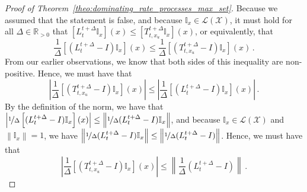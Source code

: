 \documentclass[10pt,a4paper]{paper}
\theoremstyle{definition}
\newcommand{\reals}{\mathbb{R}}
\newcommand{\realspos}{\reals_{>0}}
\newcommand{\states}{\mathcal{X}}
\newcommand{\gambles}{\mathcal{L}}
\newcommand{\gamblesX}{\gambles(\states)}
\newcommand{\ind}[1]{\mathbb{I}_{#1}}
\newcommand{\norm}[1]{\left\lVert #1 \right\rVert}
\newcommand{\abs}[1]{\left\vert #1 \right\vert}
\begin{document}
\begin{proof}[Proof of Theorem~\ref{theo:dominating_rate_processes_max_set}]
Because we assumed that the statement is false, and because $\ind{x}\in\gamblesX$, it must hold for all $\Delta\in\realspos$ that $\left[L_{t}^{t+\Delta}\ind{x}\right](x)\leq\left[T_{t,x_u}^{t+\Delta}\ind{x}\right](x)$, or equivalently, that
\begin{equation*}
\frac{1}{\Delta}\left[(L_{t}^{t+\Delta} - I)\ind{x}\right](x) \leq \frac{1}{\Delta}\left[(T_{t,x_u}^{t+\Delta} - I)\ind{x}\right](x)\,.
\end{equation*}
From our earlier observations, we know that both sides of this inequality are non-positive. Hence, we must have that
\begin{equation*}
\abs{\frac{1}{\Delta}\left[(T_{t,x_u}^{t+\Delta} - I)\ind{x}\right](x)} \leq \abs{\frac{1}{\Delta}\left[(L_{t}^{t+\Delta} - I)\ind{x}\right](x)}\,.
\end{equation*}
By the definition of the norm, we have that $\abs{\nicefrac{1}{\Delta}\left[(L_{t}^{t+\Delta} - I)\ind{x}\right](x)}\leq\norm{\nicefrac{1}{\Delta}(L_{t}^{t+\Delta} - I)\ind{x}}$, and because $\ind{x}\in\gamblesX$ and $\norm{\ind{x}}=1$, we have $\norm{\nicefrac{1}{\Delta}(L_{t}^{t+\Delta} - I)\ind{x}}\leq \norm{\nicefrac{1}{\Delta}(L_{t}^{t+\Delta} - I)}$. Hence, we must have that
\begin{equation*}
\abs{\frac{1}{\Delta}\left[(T_{t,x_u}^{t+\Delta} - I)\ind{x}\right](x)} \leq \norm{\frac{1}{\Delta}(L_{t}^{t+\Delta} - I)}\,.
\end{equation*}


\end{proof}
\end{document}

